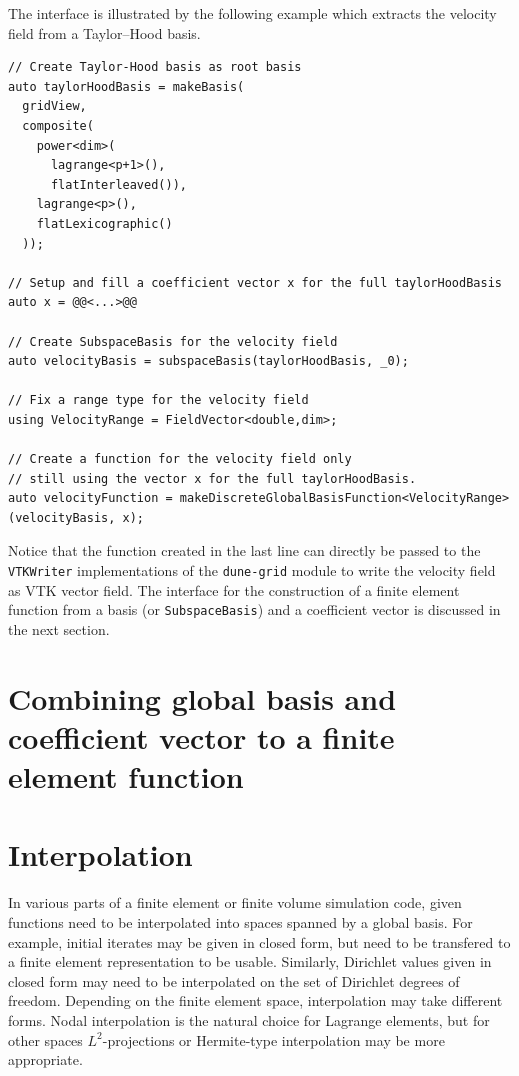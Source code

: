 \documentclass[a4paper,10pt,headings=normal,bibliography=totoc]{scrartcl}
\newcommand{\cpp}[1]{\lstinline[basicstyle=\ttfamily]!#1!}
\newcommand{\dunemodule}[1]{\texttt{#1}}
\newcommand{\todograeser}[1]{\todo[inline,color=lightblue,author=CG]{#1}}
\begin{document}
The interface is illustrated by the following
example which extracts the velocity field
from a Taylor--Hood basis.

\begin{lstlisting}[style=Example]
// Create Taylor-Hood basis as root basis
auto taylorHoodBasis = makeBasis(
  gridView,
  composite(
    power<dim>(
      lagrange<p+1>(),
      flatInterleaved()),
    lagrange<p>(),
    flatLexicographic()
  ));

// Setup and fill a coefficient vector x for the full taylorHoodBasis
auto x = @@<...>@@

// Create SubspaceBasis for the velocity field
auto velocityBasis = subspaceBasis(taylorHoodBasis, _0);

// Fix a range type for the velocity field
using VelocityRange = FieldVector<double,dim>;

// Create a function for the velocity field only
// still using the vector x for the full taylorHoodBasis.
auto velocityFunction = makeDiscreteGlobalBasisFunction<VelocityRange>(velocityBasis, x);
\end{lstlisting}

Notice that the function created in the last line can directly
be passed to the \cpp{VTKWriter} implementations of the
\dunemodule{dune-grid} module to write the velocity field
as VTK vector field. The interface for the construction of
a finite element function from a basis (or \cpp{SubspaceBasis})
and a coefficient vector is discussed in the next section.

\section{Combining global basis and coefficient vector to a finite element function}
\todograeser{Write this section}



\section{Interpolation}

In various parts of a finite element or finite volume simulation code, given functions need to be interpolated
into spaces spanned by a global basis.  For example, initial iterates may be given in closed form, but need to be
transfered to a finite element representation to be usable.  Similarly, Dirichlet values given in closed form
may need to be interpolated on the set of Dirichlet degrees of freedom.  Depending on the finite element space,
interpolation may take different forms.  Nodal interpolation is the natural choice for Lagrange elements, but
for other spaces $L^2$-projections or Hermite-type interpolation may be more appropriate.
\end{document}
